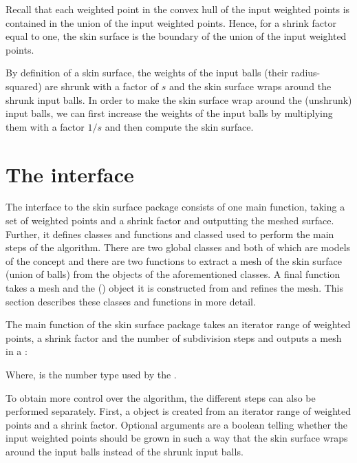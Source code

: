Recall that each weighted point in the convex hull of the input
weighted points is contained in the union of the input weighted
points. Hence, for a shrink factor equal to one, the skin surface is
the boundary of the union of the input weighted points.

By definition of a skin surface, the weights of the input balls (their
radius-squared) are shrunk with a factor of $s$ and the skin surface
wraps around the shrunk input balls. In order to make the skin surface
wrap around the (unshrunk) input balls, we can first increase the
weights of the input balls by multiplying them with a factor $1/s$ and
then compute the skin surface.

\section{The interface}
\ccThreeToTwo

The interface to the skin surface package consists of one main
function, taking a set of weighted points and a shrink factor and
outputting the meshed surface. Further, it defines classes and
functions and classed used to perform the main steps of the algorithm.
There are two global classes  and
 both of which are models of the concept
 and there are two functions to extract a mesh of
the skin surface (union of balls) from the objects of the
aforementioned classes. A final function takes a mesh and the
 () object it is constructed
from and refines the mesh. This section describes these classes and
functions in more detail.

The main function of the skin surface package takes an iterator range
of weighted points, a shrink factor and the number of subdivision
steps and outputs a mesh in a :


Where,  is the number type used by the .

To obtain more control over the algorithm, the different steps can
also be performed separately. First, a  object is
created from an iterator range of weighted points and a shrink factor.
Optional arguments are a boolean telling whether the input weighted
points should be grown in such a way that the skin surface wraps
around the input balls instead of the shrunk input balls.

